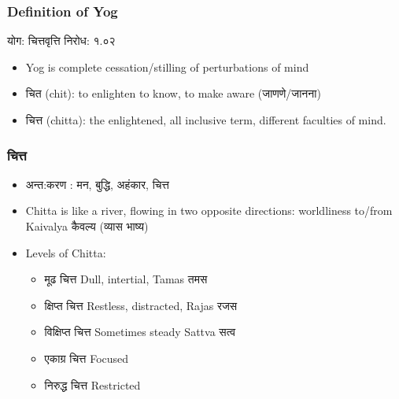 \begin{frame}[fragile]\frametitle{Definition of Yog}

योग: चित्तवृत्ति निरोध: १.०२

	\begin{itemize}
	\item Yog is complete cessation/stilling of perturbations of mind
	\item चित (chit): to enlighten to know, to make aware (जाणणे/जानना)
	\item चित्त (chitta): the enlightened, all inclusive term, different faculties of mind.
	\end{itemize}

\end{frame}


\begin{frame}[fragile]\frametitle{चित्त}

	\begin{itemize}
	\item अन्त:करण : मन, बुद्धि, अहंकार, चित्त
	\item Chitta is like a river, flowing in two opposite directions: worldliness to/from Kaivalya कैवल्य (व्यास भाष्य)
	\item Levels of Chitta:
		\begin{itemize}
		\item मूढ चित्त  Dull, intertial, Tamas तमस
		\item क्षिप्त चित्त  Restless, distracted, Rajas  रजस
		\item विक्षिप्त चित्त Sometimes steady Sattva सत्व
		\item एकाग्र चित्त Focused
		\item निरुद्ध चित्त Restricted
		
		\end{itemize}	
	\end{itemize}

\end{frame}

